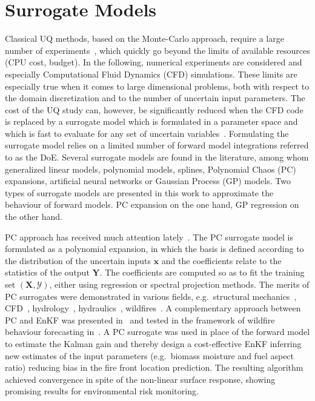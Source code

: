 \section{Surrogate Models}\label{sec:surrogate}

Classical UQ methods, based on the Monte-Carlo approach, require a large number of experiments~\citep{iooss2010,iooss2016,lamboni2011,lemaitreknio2010,Saltelli2007,Storlie2009}, which quickly go beyond the limits of available resources (CPU cost, budget). In the following, numerical experiments are considered and especially Computational Fluid Dynamics (CFD) simulations. These limits are especially true when it comes to large dimensional problems, both with respect to the domain discretization and to the number of uncertain input parameters. The cost of the UQ study can, however, be significantly reduced when the CFD code is replaced by a surrogate model which is formulated in a parameter space and which is fast to evaluate for any set of uncertain variables~\cite{martin2005}. Formulating the surrogate model relies on a limited number of forward model integrations referred to as the DoE. Several surrogate models are found in the literature, among whom generalized linear models, polynomial models, splines, Polynomial Chaos (PC) expansions, artificial neural networks or Gaussian Process (GP) models. Two types of surrogate models are presented in this work to approximate the behaviour of forward models. PC expansion on the one hand, GP regression on the other hand. 

PC approach has received much attention lately~\citep{dubreuil2014,sudret2008,xiu2010,xiu2002,Ciriello2013}. The PC surrogate model is formulated as a polynomial expansion, in which the basis is defined according to the distribution of the uncertain inputs $\mathbf{x}$ and the coefficients relate to the statistics of the output $\mathbf{Y}$. The coefficients are computed so as to fit the training set $(\mathbf{X}, \mathcal{Y})$, either using regression or spectral projection methods. The merits of PC surrogates were demonstrated in various fields, e.g.~structural mechanics~\citep{dubreuil2014,berveiller2005}, CFD~\citep{hosder2006,lucor2007,saad2007phd}, hydrology~\citep{deman2015}, hydraulics~\citep{ge2008,elmocaydphd}, wildfires~\citep{rochoux2014}. A complementary approach between PC and EnKF was presented in~\citet{lixiu2009} and tested in the framework of wildfire behaviour forecasting in~\citet{rochoux2014}. A PC surrogate was used in place of the forward model to estimate the Kalman gain and thereby design a cost-effective EnKF inferring new estimates of the input parameters (e.g.~biomass moisture and fuel aspect ratio) reducing bias in the fire front location prediction. The resulting algorithm achieved convergence in spite of the non-linear surface response, showing promising results for environmental risk monitoring. 


